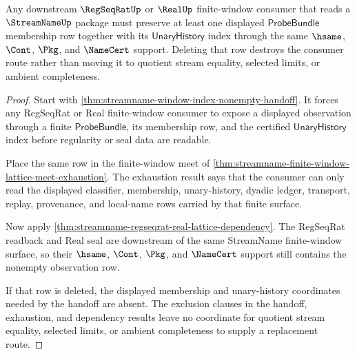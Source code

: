 \begin{theorem}
\label{thm:streamname-finite-window-nonempty}
Any downstream $\RegSeqRatUp$ or $\RealUp$ finite-window consumer that reads a
$\StreamNameUp$ package must preserve at least one displayed
$\mathsf{ProbeBundle}$ membership row together with its
$\mathsf{UnaryHistory}$ index through the same $\hsame$, $\Cont$, $\Pkg$, and
$\NameCert$ support. Deleting that row destroys the consumer route rather than
moving it to quotient stream equality, selected limits, or ambient
completeness.
\end{theorem}
\begin{proof}
Start with \autoref{thm:streamname-window-index-nonempty-handoff}. It forces
any RegSeqRat or Real finite-window consumer to expose a displayed observation
through a finite $\mathsf{ProbeBundle}$, its membership row, and the certified
$\mathsf{UnaryHistory}$ index before regularity or seal data are readable.

Place the same row in the finite-window meet of
\autoref{thm:streamname-finite-window-lattice-meet-exhaustion}. The exhaustion
result says that the consumer can only read the displayed classifier,
membership, unary-history, dyadic ledger, transport, replay, provenance, and
local-name rows carried by that finite surface.

Now apply
\autoref{thm:streamname-regseqrat-real-lattice-dependency}. The RegSeqRat
readback and Real seal are downstream of the same StreamName finite-window
surface, so their $\hsame$, $\Cont$, $\Pkg$, and $\NameCert$ support still
contains the nonempty observation row.

If that row is deleted, the displayed membership and unary-history coordinates
needed by the handoff are absent. The exclusion clauses in the handoff,
exhaustion, and dependency results leave no coordinate for quotient stream
equality, selected limits, or ambient completeness to supply a replacement
route.
\end{proof}

